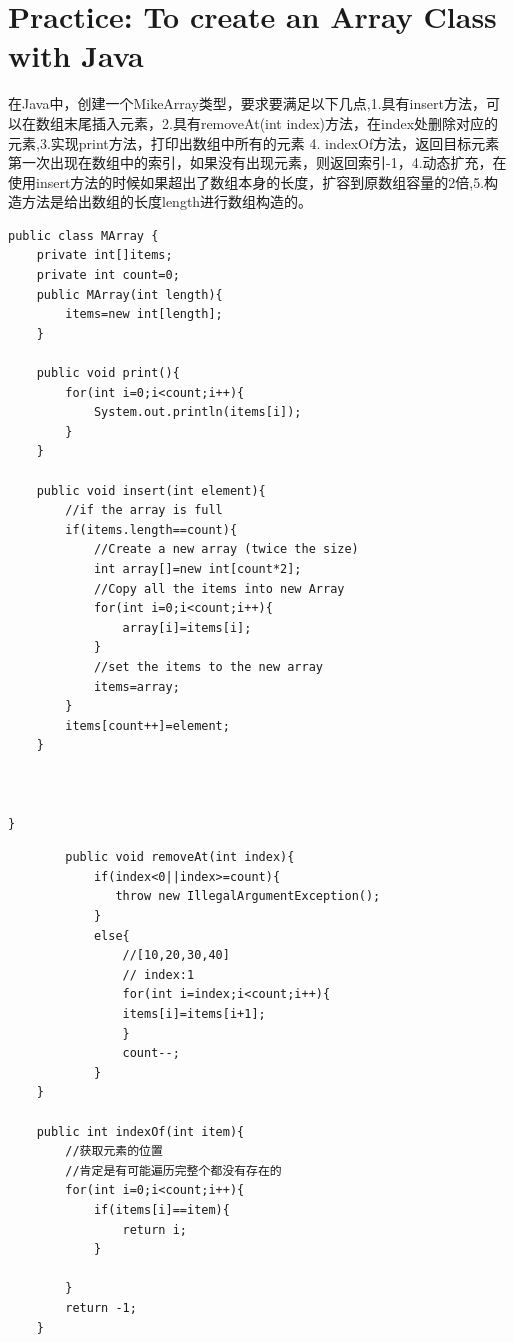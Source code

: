 \documentclass[
	11pt,
	fleqn,
	a4paper,
]{LegrandOrangeBook}
\begin{document}
\section{Practice: To create an Array Class with Java}

\begin{example}
    在Java中，创建一个MikeArray类型，要求要满足以下几点,1.具有insert方法，可以在数组末尾插入元素，2.具有removeAt(int index)方法，在index处删除对应的元素,3.实现print方法，打印出数组中所有的元素 4. indexOf方法，返回目标元素第一次出现在数组中的索引，如果没有出现元素，则返回索引-1，4.动态扩充，在使用insert方法的时候如果超出了数组本身的长度，扩容到原数组容量的2倍,5.构造方法是给出数组的长度length进行数组构造的。
\end{example}
\begin{verbatim}
public class MArray {
    private int[]items;
    private int count=0;
    public MArray(int length){
        items=new int[length];
    }

    public void print(){
        for(int i=0;i<count;i++){
            System.out.println(items[i]);
        }
    }

    public void insert(int element){
        //if the array is full
        if(items.length==count){
            //Create a new array (twice the size)
            int array[]=new int[count*2];
            //Copy all the items into new Array
            for(int i=0;i<count;i++){
                array[i]=items[i];
            }
            //set the items to the new array
            items=array;
        }
        items[count++]=element;
    }



}

\end{verbatim}

\begin{verbatim}
	    public void removeAt(int index){
            if(index<0||index>=count){
               throw new IllegalArgumentException();
            }
            else{
                //[10,20,30,40]
                // index:1
                for(int i=index;i<count;i++){
                items[i]=items[i+1];
                }
                count--;
            }
    }

    public int indexOf(int item){
        //获取元素的位置
        //肯定是有可能遍历完整个都没有存在的
        for(int i=0;i<count;i++){
            if(items[i]==item){
                return i;
            }

        }
        return -1;
    }
\end{verbatim}
\end{document}
